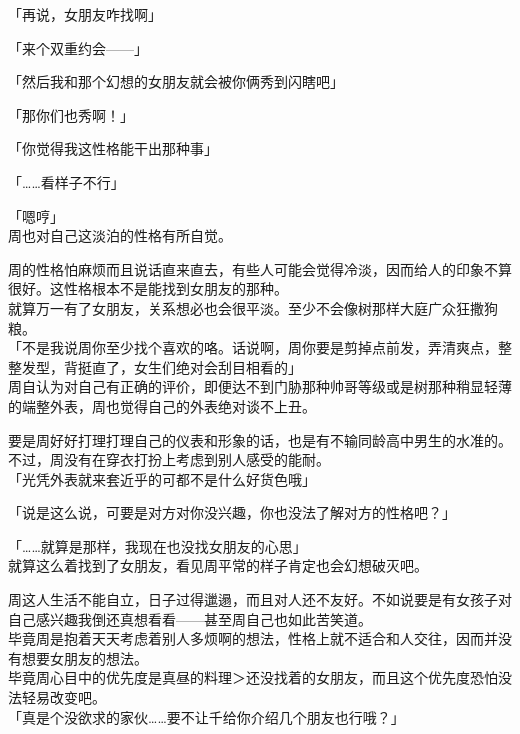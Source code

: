 「再说，女朋友咋找啊」

「来个双重约会——」

「然后我和那个幻想的女朋友就会被你俩秀到闪瞎吧」

「那你们也秀啊！」

「你觉得我这性格能干出那种事」

「……看样子不行」

「嗯哼」\\

周也对自己这淡泊的性格有所自觉。

周的性格怕麻烦而且说话直来直去，有些人可能会觉得冷淡，因而给人的印象不算很好。这性格根本不是能找到女朋友的那种。\\

就算万一有了女朋友，关系想必也会很平淡。至少不会像树那样大庭广众狂撒狗粮。\\

「不是我说周你至少找个喜欢的咯。话说啊，周你要是剪掉点前发，弄清爽点，整整发型，背挺直了，女生们绝对会刮目相看的」\\

周自认为对自己有正确的评价，即便达不到门胁那种帅哥等级或是树那种稍显轻薄的端整外表，周也觉得自己的外表绝对谈不上丑。

要是周好好打理打理自己的仪表和形象的话，也是有不输同龄高中男生的水准的。\\

不过，周没有在穿衣打扮上考虑到别人感受的能耐。\\

「光凭外表就来套近乎的可都不是什么好货色哦」

「说是这么说，可要是对方对你没兴趣，你也没法了解对方的性格吧？」

「……就算是那样，我现在也没找女朋友的心思」\\

就算这么着找到了女朋友，看见周平常的样子肯定也会幻想破灭吧。

周这人生活不能自立，日子过得邋遢，而且对人还不友好。不如说要是有女孩子对自己感兴趣我倒还真想看看——甚至周自己也如此苦笑道。\\

毕竟周是抱着天天考虑着别人多烦啊的想法，性格上就不适合和人交往，因而并没有想要女朋友的想法。\\

毕竟周心目中的优先度是真昼的料理＞还没找着的女朋友，而且这个优先度恐怕没法轻易改变吧。\\

「真是个没欲求的家伙……要不让千给你介绍几个朋友也行哦？」


